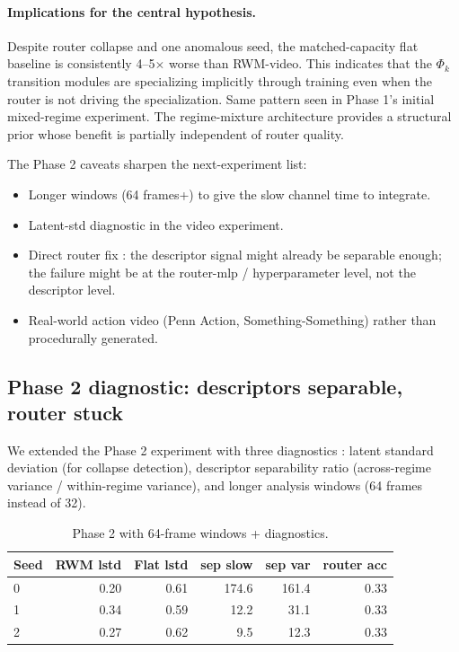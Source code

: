 \documentclass[11pt,a4paper]{article}
\begin{document}
\paragraph{Implications for the central hypothesis.} Despite router
collapse and one anomalous seed, the matched-capacity flat baseline
is consistently 4--5$\times$ worse than RWM-video. This indicates
that the $\Phi_k$ transition modules are specializing implicitly
through training even when the router is not driving the
specialization. Same pattern seen in Phase 1's initial mixed-regime
experiment. The regime-mixture architecture provides a structural
prior whose benefit is partially independent of router quality.

The Phase 2 caveats sharpen the next-experiment list:
\begin{itemize}
\item Longer windows (64 frames+) to give the slow channel time
  to integrate.
\item Latent-std diagnostic in the video experiment.
\item Direct router fix : the descriptor signal might already be
  separable enough; the failure might be at the router-mlp /
  hyperparameter level, not the descriptor level.
\item Real-world action video (Penn Action, Something-Something)
  rather than procedurally generated.
\end{itemize}

\subsection{Phase 2 diagnostic: descriptors separable, router stuck}
\label{sec:rwm-video-diag}

We extended the Phase 2 experiment with three diagnostics : latent
standard deviation (for collapse detection), descriptor separability
ratio (across-regime variance / within-regime variance), and longer
analysis windows (64 frames instead of 32).

\begin{table}[h]
\centering
\caption{Phase 2 with 64-frame windows + diagnostics.}
\label{tab:rwm-video-diag}
\begin{tabular}{lrrrrr}
\toprule
Seed & RWM lstd & Flat lstd & sep slow & sep var & router acc \\
\midrule
0 & 0.20 & 0.61 & 174.6 & 161.4 & 0.33 \\
1 & 0.34 & 0.59 & 12.2 & 31.1 & 0.33 \\
2 & 0.27 & 0.62 & 9.5 & 12.3 & 0.33 \\
\bottomrule
\end{tabular}
\end{table}
\end{document}
